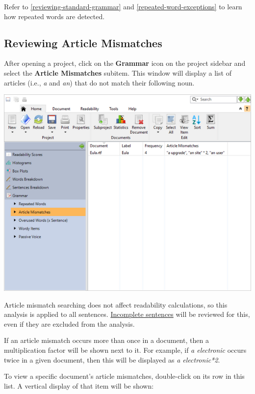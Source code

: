 \documentclass[
]{book}
\theoremstyle{definition}
\theoremstyle{definition}
\theoremstyle{definition}
\theoremstyle{definition}
\theoremstyle{remark}
\begin{document}
Refer to \ref{reviewing-standard-grammar} and \ref{repeated-word-exceptions} to learn how repeated words are detected.

\hypertarget{reviewing-batch-articles}{%
\subsection*{Reviewing Article Mismatches}\label{reviewing-batch-articles}}

After opening a project, click on the \textbf{Grammar} icon on the project sidebar and select the \textbf{Article Mismatches} subitem. This window will display a list of articles (i.e., \emph{a} and \emph{an}) that do not match their following noun.

\includegraphics{Images/batcharticlemismatches.png}

Article mismatch searching does not affect readability calculations, so this analysis is applied to all sentences. \protect\hyperlink{how-text-is-excluded}{Incomplete sentences} will be reviewed for this, even if they are excluded from the analysis.

If an article mismatch occurs more than once in a document, then a multiplication factor will be shown next to it. For example, if \emph{a electronic} occurs twice in a given document, then this will be displayed as \emph{a electronic*2}.

To view a specific document's article mismatches, double-click on its row in this list. A vertical display of that item will be shown:
\end{document}
